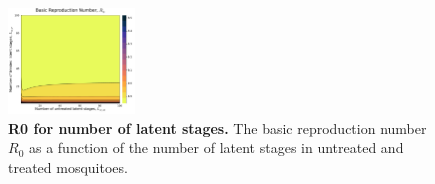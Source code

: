 \documentclass[12pt]{article}
\begin{document}
\begin{figure}[H]
    \centering
    \includegraphics[width=0.3\textwidth]{../../fig/gen_model/R0_NLMxNLT.pdf}
    \caption{\textbf{R0 for number of latent stages.} The basic reproduction number \(R_0\) as a function of the number of latent stages in untreated and treated mosquitoes.}
\end{figure}
\end{document}
